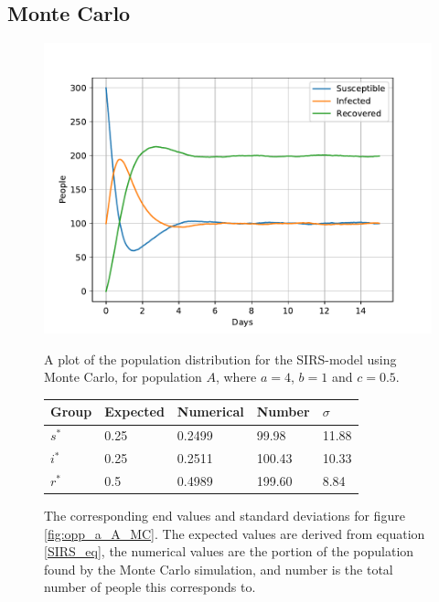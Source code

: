 \documentclass[a4paper]{article}
\let\Oldsubsection\subsection
\renewcommand{\subsection}{\FloatBarrier\Oldsubsection}
\begin{document}
	\subsection{Monte Carlo}
	\begin{figure}[!htb]
		\centering
		\begin{minipage}{0.49\textwidth}
			\centering
			\includegraphics[scale=0.6]{../plots/opp_a_A_MC.pdf}
			\caption{A plot of the population distribution for the SIRS-model using Monte Carlo, for population $A$, where $a=4$, $b=1$ and $c=0.5$. }\label{fig:opp_a_A_MC}
		\end{minipage}
		\begin{minipage}{0.49\textwidth}
			\centering
			\captionsetup{type=table} %
			\begin{tabular}{|l|l|l|l|l|}
				\hline
				Group & Expected & Numerical   & Number  & $\sigma$\\ \hline
				$s^*$ & 0.25 & 0.2499 & 99.98 & 11.88\\ \hline
				$i^*$ & 0.25 & 0.2511 & 100.43 & 10.33\\ \hline
				$r^*$ & 0.5  & 0.4989 & 199.60 & 8.84\\ \hline
			\end{tabular}
			\caption{The corresponding end values and standard deviations for figure \ref{fig:opp_a_A_MC}. The expected values are derived from equation \ref{SIRS_eq}, the numerical values are the portion of the population found by the Monte Carlo simulation, and number is the total number of people this corresponds to.}\label{tab:opp_a_A_mc}
		\end{minipage}
	\end{figure}
	
\end{document}
